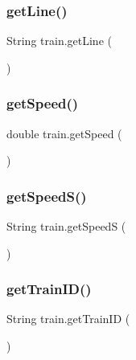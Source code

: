 \subsubsection{\texorpdfstring{get\+Line()}{getLine()}}
{\footnotesize\ttfamily String train.\+get\+Line (\begin{DoxyParamCaption}{ }\end{DoxyParamCaption})}

\mbox{\label{classtrain_add82fa33c54bc9be71bbabb9df4980b4}} 
\subsubsection{\texorpdfstring{get\+Speed()}{getSpeed()}}
{\footnotesize\ttfamily double train.\+get\+Speed (\begin{DoxyParamCaption}{ }\end{DoxyParamCaption})}

\mbox{\label{classtrain_a77ed94ef8762ffab78076216a54d7072}} 
\subsubsection{\texorpdfstring{get\+Speed\+S()}{getSpeedS()}}
{\footnotesize\ttfamily String train.\+get\+SpeedS (\begin{DoxyParamCaption}{ }\end{DoxyParamCaption})}

\mbox{\label{classtrain_a15b117ba7a9fe96a1713393316884184}} 
\subsubsection{\texorpdfstring{get\+Train\+I\+D()}{getTrainID()}}
{\footnotesize\ttfamily String train.\+get\+Train\+ID (\begin{DoxyParamCaption}{ }\end{DoxyParamCaption})}

\mbox{\label{classtrain_a4fd252f0677dfd05cdbb0dfac79477d1}} 
